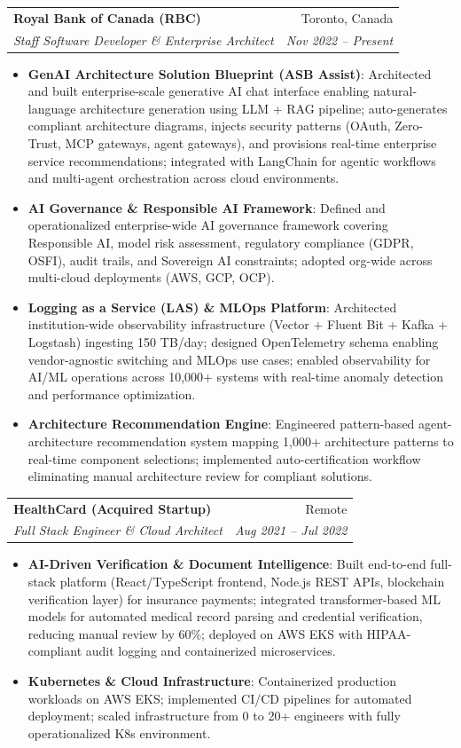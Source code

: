\documentclass[letterpaper,11pt]{article}
\makeatletter
\newcommand{\resumeItem}[2]{
  \item\small{
    \textbf{#1}{: #2 \vspace{-2pt}}
  }
}
\newcommand{\resumeSubheading}[4]{
  \vspace{-1pt}\item
    \begin{tabular*}{0.97\textwidth}{l@{\extracolsep{\fill}}r}
      \textbf{#1} & #2 \\
      \textit{\small#3} & \textit{\small #4} \\
    \end{tabular*}\vspace{-5pt}
}
\newcommand{\resumeItemListStart}{\begin{itemize}}
\newcommand{\resumeItemListEnd}{\end{itemize}\vspace{-5pt}}
\makeatother
\begin{document}
    \resumeSubheading
      {Royal Bank of Canada (RBC)}{Toronto, Canada}
      {Staff Software Developer \& Enterprise Architect}{Nov 2022 -- Present}
      \resumeItemListStart
        \resumeItem{GenAI Architecture Solution Blueprint (ASB Assist)}
          {Architected and built enterprise-scale generative AI chat interface enabling natural-language architecture generation using LLM + RAG pipeline; auto-generates compliant architecture diagrams, injects security patterns (OAuth, Zero-Trust, MCP gateways, agent gateways), and provisions real-time enterprise service recommendations; integrated with LangChain for agentic workflows and multi-agent orchestration across cloud environments.}
        \resumeItem{AI Governance \& Responsible AI Framework}
          {Defined and operationalized enterprise-wide AI governance framework covering Responsible AI, model risk assessment, regulatory compliance (GDPR, OSFI), audit trails, and Sovereign AI constraints; adopted org-wide across multi-cloud deployments (AWS, GCP, OCP).}
        \resumeItem{Logging as a Service (LAS) \& MLOps Platform}
          {Architected institution-wide observability infrastructure (Vector + Fluent Bit + Kafka + Logstash) ingesting 150 TB/day; designed OpenTelemetry schema enabling vendor-agnostic switching and MLOps use cases; enabled observability for AI/ML operations across 10,000+ systems with real-time anomaly detection and performance optimization.}
        \resumeItem{Architecture Recommendation Engine}
          {Engineered pattern-based agent-architecture recommendation system mapping 1,000+ architecture patterns to real-time component selections; implemented auto-certification workflow eliminating manual architecture review for compliant solutions.}
      \resumeItemListEnd

    \resumeSubheading
      {HealthCard (Acquired Startup)}{Remote}
      {Full Stack Engineer \& Cloud Architect}{Aug 2021 -- Jul 2022}
      \resumeItemListStart
        \resumeItem{AI-Driven Verification \& Document Intelligence}
          {Built end-to-end full-stack platform (React/TypeScript frontend, Node.js REST APIs, blockchain verification layer) for insurance payments; integrated transformer-based ML models for automated medical record parsing and credential verification, reducing manual review by 60\%; deployed on AWS EKS with HIPAA-compliant audit logging and containerized microservices.}
        \resumeItem{Kubernetes \& Cloud Infrastructure}
          {Containerized production workloads on AWS EKS; implemented CI/CD pipelines for automated deployment; scaled infrastructure from 0 to 20+ engineers with fully operationalized K8s environment.}
      \resumeItemListEnd
\end{document}
